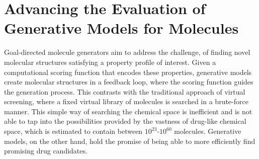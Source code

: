 


\section{Advancing the Evaluation of Generative Models for Molecules\label{sec:generative-models}}
Goal-directed molecule generators aim to address the challenge, of finding novel
molecular structures satisfying a property profile of interest. Given a computational scoring
function that encodes these properties, generative models create molecular
structures in a feedback loop, where the scoring function guides the generation
process. This contrasts with the traditional approach of virtual screening, where
a fixed virtual library of molecules is searched in a brute-force manner. This simple way 
of searching the chemical space is inefficient and is not able to 
tap into the possibilities provided by the vastness of drug-like chemical space, which is 
estimated to contain between $10^{23}$-$10^{60}$ molecules.
Generative models, on the other hand, hold the promise of being able to more efficiently find
promising drug candidates.

